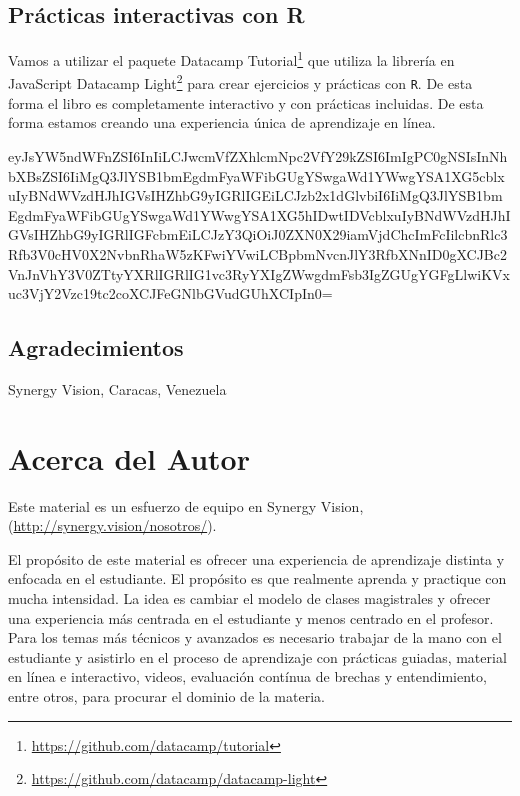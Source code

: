 \documentclass[12pt,]{krantz}
\renewcommand{\href}[2]{#2\footnote{\url{#1}}}
\theoremstyle{definition}
\theoremstyle{definition}
\theoremstyle{definition}
\theoremstyle{remark}
\let\BeginKnitrBlock\begin \let\EndKnitrBlock\end
\begin{document}
\section*{Prácticas interactivas con
R}\label{practicas-interactivas-con-r}


Vamos a utilizar el paquete
\href{https://github.com/datacamp/tutorial}{Datacamp Tutorial} que
utiliza la librería en JavaScript
\href{https://github.com/datacamp/datacamp-light}{Datacamp Light} para
crear ejercicios y prácticas con \texttt{R}. De esta forma el libro es
completamente interactivo y con prácticas incluidas. De esta forma
estamos creando una experiencia única de aprendizaje en línea.

eyJsYW5ndWFnZSI6InIiLCJwcmVfZXhlcmNpc2VfY29kZSI6ImIgPC0gNSIsInNhbXBsZSI6IiMgQ3JlYSB1bmEgdmFyaWFibGUgYSwgaWd1YWwgYSA1XG5cblxuIyBNdWVzdHJhIGVsIHZhbG9yIGRlIGEiLCJzb2x1dGlvbiI6IiMgQ3JlYSB1bmEgdmFyaWFibGUgYSwgaWd1YWwgYSA1XG5hIDwtIDVcblxuIyBNdWVzdHJhIGVsIHZhbG9yIGRlIGFcbmEiLCJzY3QiOiJ0ZXN0X29iamVjdChcImFcIilcbnRlc3Rfb3V0cHV0X2NvbnRhaW5zKFwiYVwiLCBpbmNvcnJlY3RfbXNnID0gXCJBc2VnJnVhY3V0ZTtyYXRlIGRlIG1vc3RyYXIgZWwgdmFsb3IgZGUgYGFgLlwiKVxuc3VjY2Vzc19tc2coXCJFeGNlbGVudGUhXCIpIn0=

\section*{Agradecimientos}\label{agradecimientos}


\BeginKnitrBlock{flushright}
Synergy Vision, Caracas, Venezuela
\EndKnitrBlock{flushright}

\chapter*{Acerca del Autor}\label{acerca-del-autor}


Este material es un esfuerzo de equipo en Synergy Vision,
(\url{http://synergy.vision/nosotros/}).

El propósito de este material es ofrecer una experiencia de aprendizaje
distinta y enfocada en el estudiante. El propósito es que realmente
aprenda y practique con mucha intensidad. La idea es cambiar el modelo
de clases magistrales y ofrecer una experiencia más centrada en el
estudiante y menos centrado en el profesor. Para los temas más técnicos
y avanzados es necesario trabajar de la mano con el estudiante y
asistirlo en el proceso de aprendizaje con prácticas guiadas, material
en línea e interactivo, videos, evaluación contínua de brechas y
entendimiento, entre otros, para procurar el dominio de la materia.
\end{document}
